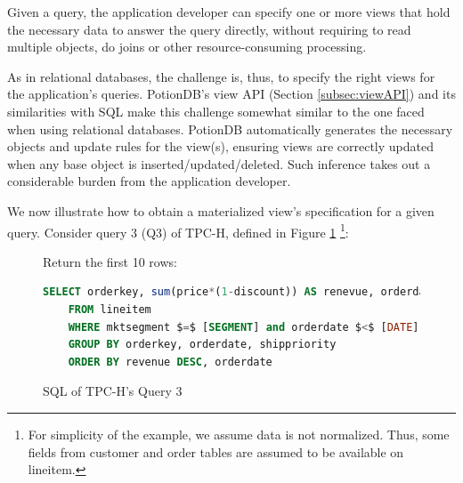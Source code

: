 \documentclass[sigplan,10pt]{acmart}
\begin{document}
Given a query, the application developer can specify one or more views that hold the necessary data to answer the query directly, without requiring to read multiple objects, do joins or other resource-consuming processing.

As in relational databases, the challenge is, thus, to specify the right views for the application's queries.
PotionDB's view API (Section \ref{subsec:viewAPI}) and its similarities with SQL make this challenge somewhat similar to the one faced when using relational databases.
PotionDB automatically generates the necessary objects and update rules for the view(s), ensuring views are correctly updated when any base object is inserted/updated/deleted.
Such inference takes out a considerable burden from the application developer.

We now illustrate how to obtain a materialized view’s specification for a given query. 
Consider query 3 (Q3) of TPC-H, defined in Figure \ref{fig:q3}
\footnote{For simplicity of the example, we assume data is not normalized. Thus, some fields from customer and order tables are assumed to be available on lineitem.}:

\begin{figure}[h]
	Return the first 10 rows: \\
	\begin{lstlisting}[language=SQL]
	SELECT orderkey, sum(price*(1-discount)) AS renevue, orderdate, shippriority
	FROM lineitem
	WHERE mktsegment $=$ [SEGMENT] and orderdate $<$ [DATE] and shipdate $>$ [DATE]
	GROUP BY orderkey, orderdate, shippriority
	ORDER BY revenue DESC, orderdate
	\end{lstlisting}
\caption{SQL of TPC-H's Query 3}
\label{fig:q3}
\end{figure}

\end{document}
